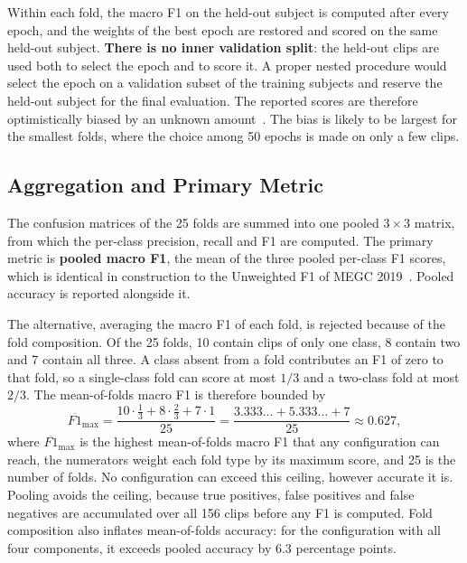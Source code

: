 Within each fold, the macro F1 on the held-out subject is computed after every epoch, and the weights of the best epoch are restored and scored on the same held-out subject. \textbf{There is no inner validation split}: the held-out clips are used both to select the epoch and to score it. A proper nested procedure would select the epoch on a validation subset of the training subjects and reserve the held-out subject for the final evaluation. The reported scores are therefore optimistically biased by an unknown amount~\cite{varma2006}. The bias is likely to be largest for the smallest folds, where the choice among 50 epochs is made on only a few clips.

\subsection{Aggregation and Primary Metric}
\label{sec:aggregation}
\label{sec:primary-metric}
\label{sec:mean-of-folds-rejected}

The confusion matrices of the 25 folds are summed into one pooled $3\times3$ matrix, from which the per-class precision, recall and F1 are computed. The primary metric is \textbf{pooled macro F1}, the mean of the three pooled per-class F1 scores, which is identical in construction to the Unweighted F1 of MEGC 2019~\cite{see2019}. Pooled accuracy is reported alongside it.

The alternative, averaging the macro F1 of each fold, is rejected because of the fold composition. Of the 25 folds, 10 contain clips of only one class, 8 contain two and 7 contain all three. A class absent from a fold contributes an F1 of zero to that fold, so a single-class fold can score at most $1/3$ and a two-class fold at most $2/3$. The mean-of-folds macro F1 is therefore bounded by
\begin{equation}
	\overline{F1}_{\max} = \frac{10 \cdot \tfrac13 + 8 \cdot \tfrac23 + 7 \cdot 1}{25} = \frac{3.333\ldots + 5.333\ldots + 7}{25} \approx 0.627,
	\label{eq:fold-ceiling}
\end{equation}
where $\overline{F1}_{\max}$ is the highest mean-of-folds macro F1 that any configuration can reach, the numerators weight each fold type by its maximum score, and 25 is the number of folds. No configuration can exceed this ceiling, however accurate it is. Pooling avoids the ceiling, because true positives, false positives and false negatives are accumulated over all 156 clips before any F1 is computed. Fold composition also inflates mean-of-folds accuracy: for the configuration with all four components, it exceeds pooled accuracy by 6.3 percentage points.


